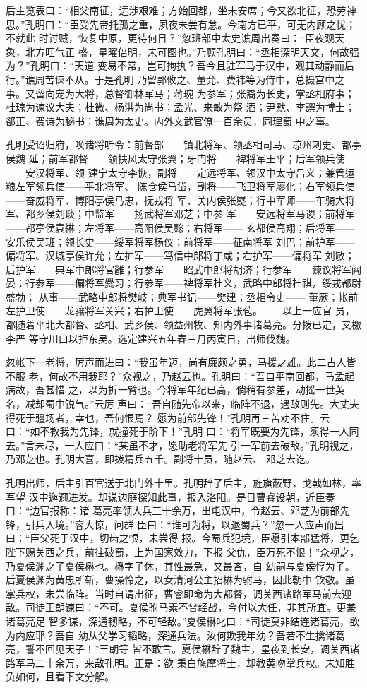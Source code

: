 后主览表曰：“相父南征，远涉艰难；方始回都，坐未安席；今又欲北征，恐劳神
思。”孔明曰：“臣受先帝托孤之重，夙夜未尝有怠。今南方已平，可无内顾之忧；不就此
时讨贼，恢复中原，更待何日？”忽班部中太史谯周出奏曰：“臣夜观天象，北方旺气正
盛，星曜倍明，未可图也。”乃顾孔明曰：“丞相深明天文，何故强为？”孔明曰：“天道
变易不常，岂可拘执？吾今且驻军马于汉中，观其动静而后行。”谯周苦谏不从。于是孔明
乃留郭攸之、董允、费祎等为侍中，总摄宫中之事。又留向宠为大将，总督御林军马；蒋琬
为参军；张裔为长史，掌丞相府事；杜琼为谏议大夫；杜微、杨洪为尚书；孟光、来敏为祭
酒；尹默、李譔为博士；郤正、费诗为秘书；谯周为太史。内外文武官僚一百余员，同理蜀
中之事。

孔明受诏归府，唤诸将听令：前督部——镇北将军、领丞相司马、凉州刺史、都亭侯魏
延；前军都督——领扶风太守张翼；牙门将——裨将军王平；后军领兵使——安汉将军、领
建宁太守李恢，副将——定远将军、领汉中太守吕义；兼管运粮左军领兵使——平北将军、
陈仓侯马岱，副将——飞卫将军廖化；右军领兵使——奋威将军、博阳亭侯马忠，抚戎将
军、关内侯张嶷；行中军师——车骑大将军、都乡侯刘琰；中监军——扬武将军邓芝；中参
军——安远将军马谡；前将军——都亭侯袁綝；左将军——高阳侯吴懿；右将军——
玄都侯高翔；后将军——安乐侯吴班；领长史——绥军将军杨仪；前将军——征南将军
刘巴；前护军——偏将军、汉城亭侯许允；左护军——笃信中郎将丁咸；右护军——偏将军
刘敏；后护军——典军中郎将官雝；行参军——昭武中郎将胡济；行参军——谏议将军阎
晏；行参军——偏将军爨习；行参军——裨将军杜义，武略中郎将杜祺，绥戎都尉盛勃；
从事——武略中郎将樊岐；典军书记——樊建；丞相令史——
董厥；帐前左护卫使——龙骧将军关兴；右护卫使——虎翼将军张苞。——以上一应官
员，都随着平北大都督、丞相、武乡侯、领益州牧、知内外事诸葛亮。分拨已定，又檄李严
等守川口以拒东吴。选定建兴五年春三月丙寅日，出师伐魏。

忽帐下一老将，厉声而进曰：“我虽年迈，尚有廉颇之勇，马援之雄。此二古人皆不服
老，何故不用我耶？”众视之，乃赵云也。孔明曰：“吾自平南回都，马孟起病故，吾甚惜
之，以为折一臂也。今将军年纪已高，倘稍有参差，动摇一世英名，减却蜀中锐气。”云厉
声曰：“吾自随先帝以来，临阵不退，遇敌则先。大丈夫得死于疆场者，幸也，吾何恨焉？
愿为前部先锋！”孔明再三苦劝不住。云曰：“如不教我为先锋，就撞死于阶下！”孔明
曰：“将军既要为先锋，须得一人同去。”言未尽，一人应曰：“某虽不才，愿助老将军先
引一军前去破敌。”孔明视之，乃邓芝也。孔明大喜，即拨精兵五千。副将十员，随赵云、
邓芝去讫。

孔明出师，后主引百官送于北门外十里。孔明辞了后主，旌旗蔽野，戈戟如林，率军望
汉中迤逦进发。却说边庭探知此事，报入洛阳。是日曹睿设朝，近臣奏曰：“边官报称：诸
葛亮率领大兵三十余万，出屯汉中，令赵云、邓芝为前部先锋，引兵入境。”睿大惊，问群
臣曰：“谁可为将，以退蜀兵？”忽一人应声而出曰：“臣父死于汉中，切齿之恨，未尝得
报。今蜀兵犯境，臣愿引本部猛将，更乞陛下赐关西之兵，前往破蜀，上为国家效力，下报
父仇，臣万死不恨！”众视之，乃夏侯渊之子夏侯楙也。楙字子休，其性最急，又最吝，自
幼嗣与夏侯惇为子。后夏侯渊为黄忠所斩，曹操怜之，以女清河公主招楙为驸马，因此朝中
钦敬。虽掌兵权，未尝临阵。当时自请出征，曹睿即命为大都督，调关西诸路军马前去迎
敌。司徒王朗谏曰：“不可。夏侯驸马素不曾经战，今付以大任，非其所宜。更兼诸葛亮足
智多谋，深通韧略，不可轻敌。”夏侯楙叱曰：“司徒莫非结连诸葛亮，欲为内应耶？吾自
幼从父学习韬略，深通兵法。汝何欺我年幼？吾若不生擒诸葛亮，誓不回见天子！”王朗等
皆不敢言。夏侯楙辞了魏主，星夜到长安，调关西诸路军马二十余万，来敌孔明。正是：欲
秉白旄摩将士，却教黄吻掌兵权。未知胜负如何，且看下文分解。